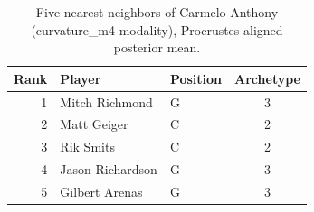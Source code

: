 \begin{table}[htbp]
  \centering\small
  \begin{tabular}{rllc}
    \toprule
    Rank & Player & Position & Archetype \\
    \midrule
    1 & Mitch Richmond & G & 3 \\
    2 & Matt Geiger & C & 2 \\
    3 & Rik Smits & C & 2 \\
    4 & Jason Richardson & G & 3 \\
    5 & Gilbert Arenas & G & 3 \\
    \bottomrule
  \end{tabular}
  \caption{Five nearest neighbors of Carmelo Anthony (curvature_m4 modality), Procrustes-aligned posterior mean.}
  \label{tab:Carmelo_Anthony_neighbors_curvature_m4}
\end{table}

